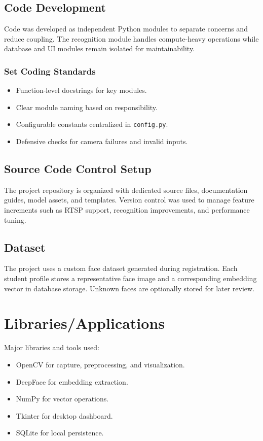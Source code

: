 \documentclass{fisatprojectfinal}
\begin{document}
\subsection{Code Development}
Code was developed as independent Python modules to separate concerns and reduce coupling. The recognition module handles compute-heavy operations while database and UI modules remain isolated for maintainability.

\subsubsection{Set Coding Standards}
\begin{itemize}
	\item Function-level docstrings for key modules.
	\item Clear module naming based on responsibility.
	\item Configurable constants centralized in \texttt{config.py}.
	\item Defensive checks for camera failures and invalid inputs.
\end{itemize}

\subsection{Source Code Control Setup}
The project repository is organized with dedicated source files, documentation guides, model assets, and templates. Version control was used to manage feature increments such as RTSP support, recognition improvements, and performance tuning.

\subsection{Dataset}
The project uses a custom face dataset generated during registration. Each student profile stores a representative face image and a corresponding embedding vector in database storage. Unknown faces are optionally stored for later review.

\section{Libraries/Applications}
Major libraries and tools used:
\begin{itemize}
	\item OpenCV for capture, preprocessing, and visualization.
	\item DeepFace for embedding extraction.
	\item NumPy for vector operations.
	\item Tkinter for desktop dashboard.
	\item SQLite for local persistence.
\end{itemize}
\end{document}
